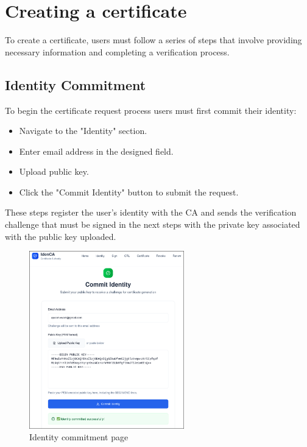 \section{Creating a certificate}
To create a certificate, users must follow a series of steps that involve providing necessary 
information and completing a verification process. 
\subsection{Identity Commitment}
To begin the certificate request process users must first commit their identity:
\begin{itemize}
    \item Navigate to the "Identity" section.
    \item Enter email address in the designed field.
    \item Upload public key.
    \item Click the "Commit Identity" button to submit the request.
\end{itemize}
These steps register the user's identity with the CA and sends the verification challenge that must 
be signed in the next steps with the private key associated with the public key uploaded.
\begin{figure}[h!]
    \centering
    \includegraphics[keepaspectratio, width=0.6\textwidth]{Pic/2_identity_committed.png}
    \caption{Identity commitment page}
    \label{fig:identity-commitment}
\end{figure}

